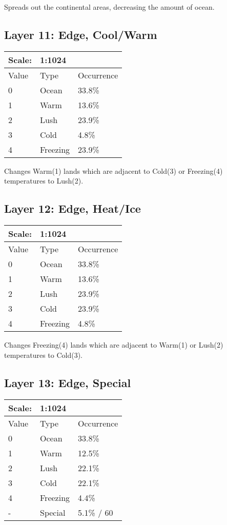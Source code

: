 \documentclass{article}
\begin{document}
	\medskip\noindent
	Spreads out the continental areas, decreasing the amount of ocean.

	\subsection{Layer 11: Edge, Cool/Warm}
	\begin{tabular}{|l|l|l|}\hline
		Scale: & \multicolumn{2}{|l|}{1:1024} \\\hline\hline
		Value  & Type     & Occurrence \\\hline
		0      & Ocean    & 33.8\%\\\hline
		1      & Warm     & 13.6\%\\\hline
		2      & Lush     & 23.9\%\\\hline
		3      & Cold     & 4.8\%\\\hline
		4      & Freezing & 23.9\%\\\hline
	\end{tabular}
	
	\medskip\noindent
	Changes Warm(1) lands which are adjacent to Cold(3) or Freezing(4) temperatures to Lush(2).
	
	\subsection{Layer 12: Edge, Heat/Ice}
	\begin{tabular}{|l|l|l|}\hline
		Scale: & \multicolumn{2}{|l|}{1:1024} \\\hline\hline
		Value  & Type     & Occurrence \\\hline
		0      & Ocean    & 33.8\%\\\hline
		1      & Warm     & 13.6\%\\\hline
		2      & Lush     & 23.9\%\\\hline
		3      & Cold     & 23.9\%\\\hline
		4      & Freezing & 4.8\%\\\hline
	\end{tabular}

	\medskip\noindent
	Changes Freezing(4) lands which are adjacent to Warm(1) or Lush(2) temperatures to Cold(3).

	\subsection{Layer 13: Edge, Special}
	\begin{tabular}{|l|l|l|}\hline
		Scale: & \multicolumn{2}{|l|}{1:1024} \\\hline\hline
		Value  & Type     & Occurrence \\\hline
		0      & Ocean    & 33.8\%\\\hline
		1      & Warm     & 12.5\%\\\hline
		2      & Lush     & 22.1\%\\\hline
		3      & Cold     & 22.1\%\\\hline
		4      & Freezing & 4.4\%\\\hline
		-      & Special  & 5.1\% / 60\\\hline
	\end{tabular}
	
\end{document}
